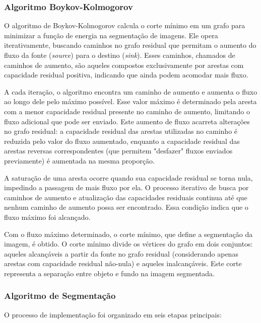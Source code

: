 \documentclass[12pt]{article}
\begin{document}
\subsubsection{Algoritmo Boykov-Kolmogorov}

O algoritmo de Boykov-Kolmogorov calcula o corte mínimo em um grafo para minimizar a função de energia na segmentação de imagens. Ele opera iterativamente, buscando caminhos no grafo residual que permitam o aumento do fluxo da fonte (\textit{source}) para o destino (\textit{sink}). Esses caminhos, chamados de caminhos de aumento, são aqueles compostos exclusivamente por arestas com capacidade residual positiva, indicando que ainda podem acomodar mais fluxo.

A cada iteração, o algoritmo encontra um caminho de aumento e aumenta o fluxo ao longo dele pelo máximo possível. Esse valor máximo é determinado pela aresta com a menor capacidade residual presente no caminho de aumento, limitando o fluxo adicional que pode ser enviado. Este aumento de fluxo acarreta alterações no grafo residual: a capacidade residual das arestas utilizadas no caminho é reduzida pelo valor do fluxo aumentado, enquanto a capacidade residual das arestas reversas correspondentes (que permitem "desfazer" fluxos enviados previamente) é aumentada na mesma proporção.

A saturação de uma aresta ocorre quando sua capacidade residual se torna nula, impedindo a passagem de mais fluxo por ela. O processo iterativo de busca por caminhos de aumento e atualização das capacidades residuais continua até que nenhum caminho de aumento possa ser encontrado. Essa condição indica que o fluxo máximo foi alcançado.

Com o fluxo máximo determinado, o corte mínimo, que define a segmentação da imagem, é obtido. O corte mínimo divide os vértices do grafo em dois conjuntos: aqueles alcançáveis a partir da fonte no grafo residual (considerando apenas arestas com capacidade residual não-nula) e aqueles inalcançáveis. Este corte representa a separação entre objeto e fundo na imagem segmentada.

\subsubsection{Algoritmo de Segmentação}
O processo de implementação foi organizado em seis etapas principais:
\end{document}
